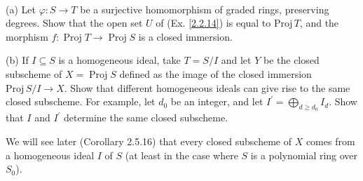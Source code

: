 \begin{exe}
	\label{2.3.12}
	\ 
	
	(a) Let $\varphi: S \rightarrow T$ be a surjective homomorphism of graded rings, preserving degrees. Show that the open set $U$ of (Ex. \ref{2.2.14}) is equal to $\mathrm{Proj}\, T$, and the morphism $f: \operatorname{Proj} T \rightarrow \operatorname{Proj} S$ is a closed immersion.
	
	(b) If $I \subseteq S$ is a homogeneous ideal, take $T=S / I$ and let $Y$ be the closed subscheme of $X=\operatorname{Proj} S$ defined as the image of the closed immersion $\mathrm{Proj}\, S / I \rightarrow X .$ Show that different homogeneous ideals can give rise to the same closed subscheme. For example, let $d_{0}$ be an integer, and let $I^{\prime}=\bigoplus_{d \geq d_{0}} I_{d} .$ Show that $I$ and $I^{\prime}$ determine the same closed subscheme.
	
	We will see later (Corollary 2.5.16) that every closed subscheme of $X$ comes from a homogeneous ideal $I$ of $S$ (at least in the case where $S$ is a polynomial ring over $S_0$).
\end{exe}

